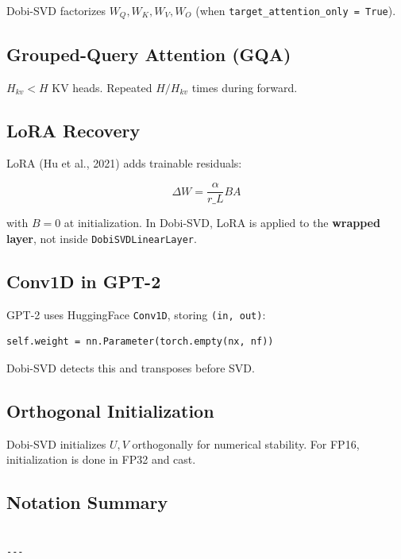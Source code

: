 Dobi-SVD factorizes $W_Q, W_K, W_V, W_O$ (when \texttt{target\_attention\_only = True}).

\subsection{Grouped-Query Attention (GQA)}

$H_{kv} < H$ KV heads. Repeated $H / H_{kv}$ times during forward.

\subsection{LoRA Recovery}

LoRA (Hu et al., 2021) adds trainable residuals:

\[
\Delta W = \frac{\alpha}{r\_L} B A
\tag{3.10}
\]

with $B = 0$ at initialization. In Dobi-SVD, LoRA is applied to the 
\textbf{wrapped layer}, not inside \texttt{DobiSVDLinearLayer}.

\subsection{Conv1D in GPT-2}

GPT-2 uses HuggingFace \texttt{Conv1D}, storing \texttt{(in, out)}:

\begin{lstlisting}
self.weight = nn.Parameter(torch.empty(nx, nf))
\end{lstlisting}

Dobi-SVD detects this and transposes before SVD.

\subsection{Orthogonal Initialization}

Dobi-SVD initializes $U, V$ orthogonally for numerical stability. For 
FP16, initialization is done in FP32 and cast.

\subsection{Notation Summary}

\begin{lstlisting}

---
\end{lstlisting}



